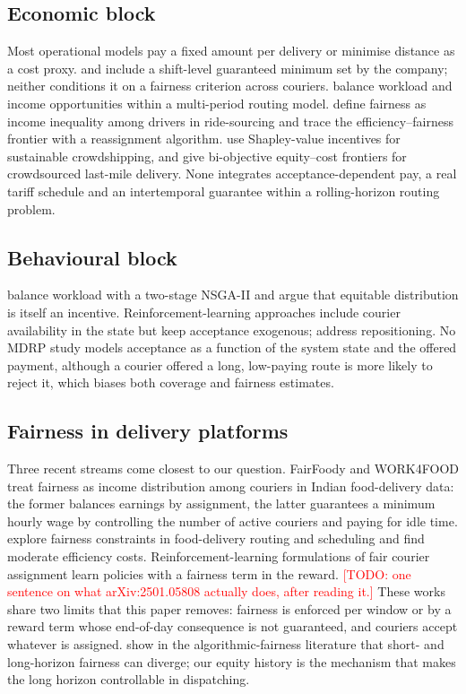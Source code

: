 \documentclass[preprint,12pt,authoryear]{elsarticle}%
\newcommand{\todo}[1]{\textcolor{red}{[TODO: #1]}}
\begin{document}
\subsection{Economic block}

Most operational models pay a fixed amount per delivery or minimise distance as a cost proxy. \citet{reyes2018meal} and \citet{yildiz2019provably} include a shift-level guaranteed minimum set by the company; neither conditions it on a fairness criterion across couriers. \citet{wen2010dynamic} balance workload and income opportunities within a multi-period routing model. \citet{lesmana2019balancing} define fairness as income inequality among drivers in ride-sourcing and trace the efficiency--fairness frontier with a reassignment algorithm. \citet{bajec2022strategic} use Shapley-value incentives for sustainable crowdshipping, and \citet{sobhanan2024equity} give bi-objective equity--cost frontiers for crowdsourced last-mile delivery. None integrates acceptance-dependent pay, a real tariff schedule and an intertemporal guarantee within a rolling-horizon routing problem.

\subsection{Behavioural block}

\citet{liao2020multi} balance workload with a two-stage NSGA-II and argue that equitable distribution is itself an incentive. Reinforcement-learning approaches \citep{ahamed2020deep,bozanta2022courier} include courier availability in the state but keep acceptance exogenous; \citet{haferkamp2022heatmap} address repositioning. No MDRP study models acceptance as a function of the system state and the offered payment, although a courier offered a long, low-paying route is more likely to reject it, which biases both coverage and fairness estimates.

\subsection{Fairness in delivery platforms}

Three recent streams come closest to our question. FairFoody \citep{gupta2022fairfoody} and WORK4FOOD \citep{nair2022work4food} treat fairness as income distribution among couriers in Indian food-delivery data: the former balances earnings by assignment, the latter guarantees a minimum hourly wage by controlling the number of active couriers and paying for idle time. \citet{martinez2024exploring} explore fairness constraints in food-delivery routing and scheduling and find moderate efficiency costs. Reinforcement-learning formulations of fair courier assignment \citep{rl2025fairdelivery} learn policies with a fairness term in the reward. \todo{one sentence on what arXiv:2501.05808 actually does, after reading it.} These works share two limits that this paper removes: fairness is enforced per window or by a reward term whose end-of-day consequence is not guaranteed, and couriers accept whatever is assigned. \citet{corbettdavies2023measure} show in the algorithmic-fairness literature that short- and long-horizon fairness can diverge; our equity history is the mechanism that makes the long horizon controllable in dispatching.
\end{document}
